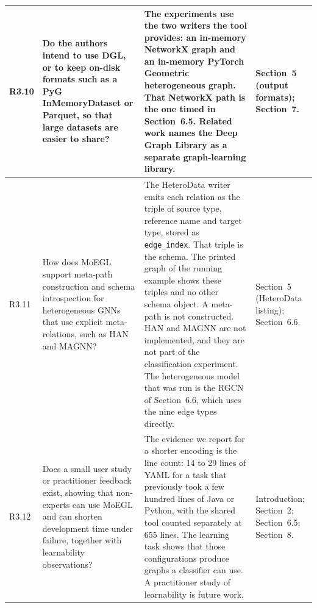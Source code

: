 \documentclass[11pt,a4paper]{article}
\begin{document}
\begin{longtable}{@{}P{1.0cm}P{4.3cm}P{5.9cm}P{3.9cm}@{}}
R3.10 &
Do the authors intend to use DGL, or to keep on-disk formats such as a PyG InMemoryDataset or Parquet, so that large datasets are easier to share? &
The experiments use the two writers the tool provides: an in-memory NetworkX graph and an in-memory PyTorch Geometric heterogeneous graph. That NetworkX path is the one timed in Section~6.5. Related work names the Deep Graph Library as a separate graph-learning library. &
Section~5 (output formats); Section~7. \\
\midrule

R3.11 &
How does MoEGL support meta-path construction and schema introspection for heterogeneous GNNs that use explicit meta-relations, such as HAN and MAGNN? &
The HeteroData writer emits each relation as the triple of source type, reference name and target type, stored as \texttt{edge\_index}. That triple is the schema. The printed graph of the running example shows these triples and no other schema object. A meta-path is not constructed. HAN and MAGNN are not implemented, and they are not part of the classification experiment. The heterogeneous model that was run is the RGCN of Section~6.6, which uses the nine edge types directly. &
Section~5 (HeteroData listing); Section~6.6. \\
\midrule

R3.12 &
Does a small user study or practitioner feedback exist, showing that non-experts can use MoEGL and can shorten development time under failure, together with learnability observations? &
The evidence we report for a shorter encoding is the line count: 14 to 29 lines of YAML for a task that previously took a few hundred lines of Java or Python, with the shared tool counted separately at 655 lines. The learning task shows that those configurations produce graphs a classifier can use. A practitioner study of learnability is future work. &
Introduction; Section~2; Section~6.5; Section~8. \\

\end{longtable}
\end{document}
